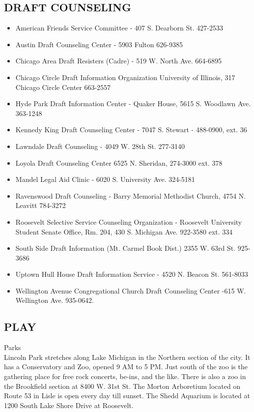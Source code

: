 \documentclass[11pt,twoside,a4paper]{book}
\begin{document}
\subsection{DRAFT COUNSELING}
\begin{itemize}
\item American Friends Service Committee  - 407 S. Dearborn St. 427-2533 
\item Austin Draft Counseling Center   - 5903 Fulton 626-9385
\item Chicago Area Draft Resisters (Cadre) - 519 W. North Ave. 664-6895 
\item Chicago Circle Draft Information Organization University of Illinois, 317 Chicago Circle Center 663-2557 
\item Hyde Park Draft Information Center - Quaker House, 5615 S. Woodlawn Ave. 363-1248
\item Kennedy King Draft Counseling Center - 7047 S. Stewart - 488-0900, ext. 36
\item Lawndale Draft Counseling - 4049 W. 28th St. 277-3140
\item Loyola Draft Counseling Center  6525 N. Sheridan, 274-3000 ext. 378 
\item Mandel Legal Aid Clinic - 6020 S. University Ave. 324-5181 
\item Ravenswood Draft Counseling - Barry Memorial Methodist Church, 4754 N. Leavitt 784-3272 
\item Roosevelt Selective Service Counseling Organization - Roosevelt University Student Senate Office, Rm. 204, 430 S. Michigan Ave. 922-3580 ext. 334 
\item South Side Draft Information (Mt. Carmel Book Dist.) 2355 W. 63rd St. 925-3686 
\item Uptown Hull House Draft Information Service - 4520 N. Beacon St. 561-8033 
\item Wellington Avenue Congregational Church Draft Counseling Center -615 W. Wellington Ave. 935-0642.
\end{itemize}

\subsection{PLAY}

Parks~\\
Lincoln Park stretches along Lake Michigan in the Northern section of the city. It has a Conservatory and Zoo, opened 9 AM to 5 PM. Just south of the zoo is the gathering place for free rock concerts, be-ins, and the like.  There is also a zoo in the Brookfield section at 8400 W. 31st St. The Morton Arboretium located on Route 53 in Lisle is open every day till sunset. The Shedd Aquarium is located at 1200 South Lake Shore Drive at Roosevelt.~\\
\end{document}
